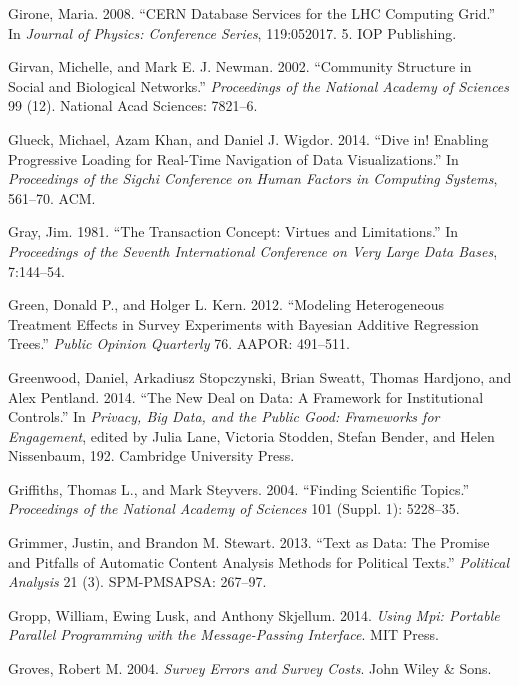 \documentclass[]{krantz}
\begin{document}
\hypertarget{ref-girone2008cern}{}
Girone, Maria. 2008. ``CERN Database Services for the LHC Computing
Grid.'' In \emph{Journal of Physics: Conference Series}, 119:052017. 5.
IOP Publishing.

\hypertarget{ref-girvan2002community}{}
Girvan, Michelle, and Mark E. J. Newman. 2002. ``Community Structure in
Social and Biological Networks.'' \emph{Proceedings of the National
Academy of Sciences} 99 (12). National Acad Sciences: 7821--6.

\hypertarget{ref-glueck2014dive}{}
Glueck, Michael, Azam Khan, and Daniel J. Wigdor. 2014. ``Dive in!
Enabling Progressive Loading for Real-Time Navigation of Data
Visualizations.'' In \emph{Proceedings of the Sigchi Conference on Human
Factors in Computing Systems}, 561--70. ACM.

\hypertarget{ref-gray1981transaction}{}
Gray, Jim. 1981. ``The Transaction Concept: Virtues and Limitations.''
In \emph{Proceedings of the Seventh International Conference on Very
Large Data Bases}, 7:144--54.

\hypertarget{ref-green2012modeling}{}
Green, Donald P., and Holger L. Kern. 2012. ``Modeling Heterogeneous
Treatment Effects in Survey Experiments with Bayesian Additive
Regression Trees.'' \emph{Public Opinion Quarterly} 76. AAPOR: 491--511.

\hypertarget{ref-greenwood2014}{}
Greenwood, Daniel, Arkadiusz Stopczynski, Brian Sweatt, Thomas Hardjono,
and Alex Pentland. 2014. ``The New Deal on Data: A Framework for
Institutional Controls.'' In \emph{Privacy, Big Data, and the Public
Good: Frameworks for Engagement}, edited by Julia Lane, Victoria
Stodden, Stefan Bender, and Helen Nissenbaum, 192. Cambridge University
Press.

\hypertarget{ref-griffiths-04}{}
Griffiths, Thomas L., and Mark Steyvers. 2004. ``Finding Scientific
Topics.'' \emph{Proceedings of the National Academy of Sciences} 101
(Suppl. 1): 5228--35.

\hypertarget{ref-grimmer2013text}{}
Grimmer, Justin, and Brandon M. Stewart. 2013. ``Text as Data: The
Promise and Pitfalls of Automatic Content Analysis Methods for Political
Texts.'' \emph{Political Analysis} 21 (3). SPM-PMSAPSA: 267--97.

\hypertarget{ref-mpi}{}
Gropp, William, Ewing Lusk, and Anthony Skjellum. 2014. \emph{Using Mpi:
Portable Parallel Programming with the Message-Passing Interface}. MIT
Press.

\hypertarget{ref-groves2004survey}{}
Groves, Robert M. 2004. \emph{Survey Errors and Survey Costs}. John
Wiley \& Sons.
\end{document}
